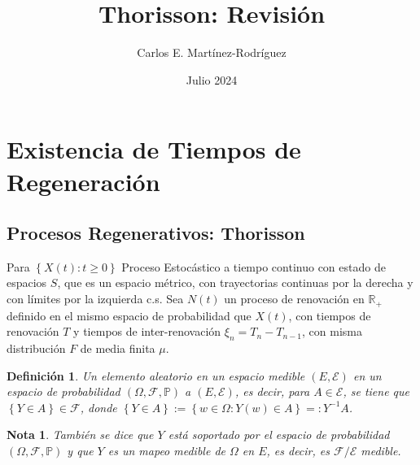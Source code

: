 \documentclass{article}
\title{Thorisson: Revisi\'on}
\author{Carlos E. Martínez-Rodríguez}
\date{Julio 2024}
\newtheorem{Def}{Definición}
\newtheorem{Note}{Nota}
\newcommand{\rea}{\mathbb{R}}
\newcommand{\prob}{\mathbb{P}}
\begin{document}
\maketitle

\tableofcontents
%
\section{Existencia de Tiempos de Regeneraci\'on}
%

\subsection{Procesos Regenerativos: Thorisson}

Para $\left\{X\left(t\right):t\geq0\right\}$ Proceso Estoc\'astico a tiempo continuo con estado de espacios $S$, que es un espacio m\'etrico, con trayectorias continuas por la derecha y con l\'imites por la izquierda c.s. Sea $N\left(t\right)$ un proceso de renovaci\'on en $\rea_{+}$ definido en el mismo espacio de probabilidad que $X\left(t\right)$, con tiempos de renovaci\'on $T$ y tiempos de inter-renovaci\'on $\xi_{n}=T_{n}-T_{n-1}$, con misma distribuci\'on $F$ de media finita $\mu$.

\begin{Def}
Un elemento aleatorio en un espacio medible $\left(E,\mathcal{E}\right)$ en un espacio de probabilidad $\left(\Omega,\mathcal{F},\prob\right)$ a $\left(E,\mathcal{E}\right)$, es decir,
para $A\in \mathcal{E}$,  se tiene que $\left\{Y\in A\right\}\in\mathcal{F}$, donde $\left\{Y\in A\right\}:=\left\{w\in\Omega:Y\left(w\right)\in A\right\}=:Y^{-1}A$.
\end{Def}

\begin{Note}
Tambi\'en se dice que $Y$ est\'a soportado por el espacio de probabilidad $\left(\Omega,\mathcal{F},\prob\right)$ y que $Y$ es un mapeo medible de $\Omega$ en $E$, es decir, es $\mathcal{F}/\mathcal{E}$ medible.
\end{Note}
\end{document}
